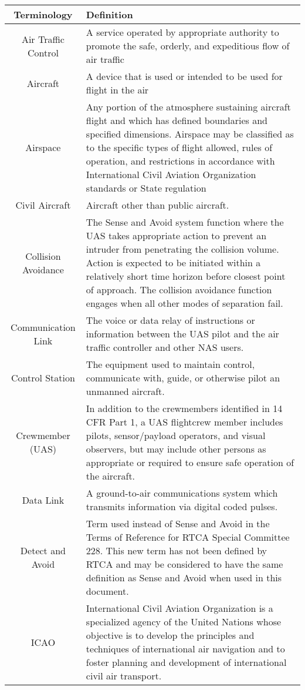 \begin{tabularx}{\textwidth}{S{0.22}|X} 
    \toprule
     Terminology &Definition  \\\hline
    \midrule
    \endhead
     Air Traffic Control & A service operated by appropriate authority to promote the safe, orderly, and expeditious flow of air traffic\\\hline
     Aircraft & A device that is used or intended to be used for flight in the air\\\hline
     Airspace & Any portion of the atmosphere sustaining aircraft flight and which has defined boundaries and specified dimensions. Airspace may be classified as to the specific types of flight allowed, rules of operation, and restrictions in accordance with International Civil Aviation Organization standards or State regulation\\\hline
     Civil Aircraft & Aircraft other than public aircraft. \\\hline
     Collision \mbox{Avoidance} & The Sense and Avoid system function where the UAS takes appropriate action to prevent an intruder from penetrating the collision volume. Action is expected to be initiated within a relatively short time horizon before closest point of approach. The collision avoidance function engages when all other modes of separation fail.\\\hline
     Communication Link & The voice or data relay of instructions or information between the UAS pilot and the air traffic controller and other NAS users.\\\hline
     Control Station & The equipment used to maintain control, communicate with, guide, or otherwise pilot an unmanned aircraft.\\\hline
     Crewmember (UAS) & In addition to the crewmembers identified in 14 CFR Part 1, a UAS flightcrew member includes pilots, sensor/payload operators, and visual observers, but may include other persons as appropriate or required to ensure safe operation of the aircraft.\\\hline
     Data Link & A ground-to-air communications system which transmits information via digital coded pulses.\\\hline
     Detect and Avoid & Term used instead of Sense and Avoid in the Terms of Reference for RTCA Special Committee 228. This new term has not been defined by RTCA and may be considered to have the same definition as Sense and Avoid when used in this document.\\\hline
     ICAO & International Civil Aviation Organization is a specialized agency of the United Nations whose objective is to develop the principles and techniques of international air navigation and to foster planning and development of international civil air transport.\\\hline

\end{tabularx}
